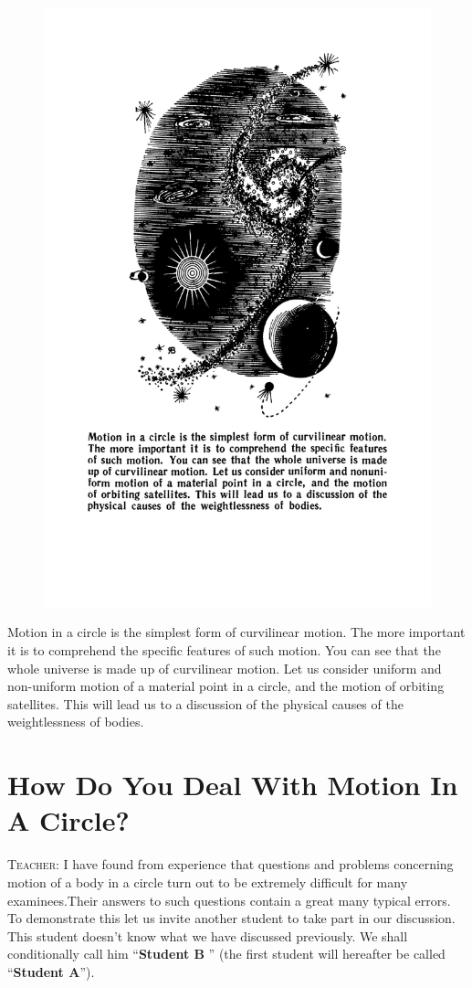\documentclass[a4paper,sfsidenotes]{tufte-book}
\begin{document}
\begin{figure}
\centering
\includegraphics[width=0.65\linewidth]{sec-c.pdf}
\end{figure}
\begin{fullwidth}
\begin{Large}
Motion in a circle is the simplest form of curvilinear motion. The more important it is to comprehend the specific features of such motion. You can see that the whole universe is made up of curvilinear motion. Let us consider uniform and non-uniform motion of a material point in a circle, and the motion of orbiting satellites. This will lead us to a discussion of the physical causes of the weightlessness of bodies.
\end{Large}
\end{fullwidth}

\chapter{How Do You Deal With Motion In A Circle?}
\label{ch-08}

\textsc{Teacher:} I have found from experience that questions and problems concerning motion of a body in a circle turn out to be extremely difficult for many examinees.Their answers to such questions contain a great many typical errors. To demonstrate this let us invite another student
to take part in our discussion. This student doesn't know what we have discussed previously. We shall conditionally call him ``\textsf{\textbf{Student B}} '' (the first student will hereafter be called ``\textsf{\textbf{Student A}}'').
\end{document}

